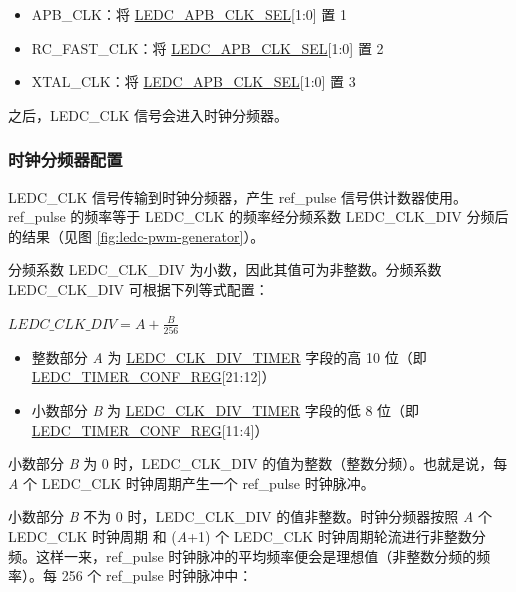 \documentclass[main\_\_CN.tex]{subfiles}
\begin{document}
\begin{itemize}
    \item APB\_CLK：将 \hyperref[fielddesc:LEDCAPBCLKSEL]{LEDC\_APB\_CLK\_SEL}[1:0] 置 1
    \item RC\_FAST\_CLK：将 \hyperref[fielddesc:LEDCAPBCLKSEL]{LEDC\_APB\_CLK\_SEL}[1:0] 置 2
    \item XTAL\_CLK：将 \hyperref[fielddesc:LEDCAPBCLKSEL]{LEDC\_APB\_CLK\_SEL}[1:0] 置 3
\end{itemize}


之后，LEDC\_CLK 信号会进入时钟分频器。

\subsubsection{时钟分频器配置}
LEDC\_CLK 信号传输到时钟分频器，产生 ref\_pulse 信号供计数器使用。ref\_pulse 的频率等于 LEDC\_CLK 的频率经分频系数 LEDC\_CLK\_DIV 分频后的结果（见图 \ref{fig:ledc-pwm-generator}）。

分频系数 LEDC\_CLK\_DIV 为小数，因此其值可为非整数。分频系数 LEDC\_CLK\_DIV 可根据下列等式配置：

\begin{center}
$LEDC\_CLK\_DIV = A + \frac{B}{256}$
\end{center}

\begin{itemize}
    \item 整数部分 \textit{A} 为 \hyperref[fielddesc:LEDCCLKDIVTIMERX]{LEDC\_CLK\_DIV\_TIMER} 字段的高 10 位（即 \hyperref[regdesc:LEDCTIMERXCONFREG]{LEDC\_TIMER\_CONF\_REG}[21:12]）
    \item 小数部分 \textit{B} 为 \hyperref[fielddesc:LEDCCLKDIVTIMERX]{LEDC\_CLK\_DIV\_TIMER} 字段的低 8 位（即 \hyperref[regdesc:LEDCTIMERXCONFREG]{LEDC\_TIMER\_CONF\_REG}[11:4]）
\end{itemize}

小数部分 \textit{B} 为 0 时，LEDC\_CLK\_DIV 的值为整数（整数分频）。也就是说，每 \textit{A} 个 LEDC\_CLK 时钟周期产生一个 ref\_pulse 时钟脉冲。

小数部分 \textit{B} 不为 0 时，LEDC\_CLK\_DIV 的值非整数。时钟分频器按照 \textit{A} 个 LEDC\_CLK 时钟周期 和 (\textit{A}+1) 个 LEDC\_CLK 时钟周期轮流进行非整数分频。这样一来，ref\_pulse 时钟脉冲的平均频率便会是理想值（非整数分频的频率）。每 256 个 ref\_pulse 时钟脉冲中：
\end{document}
